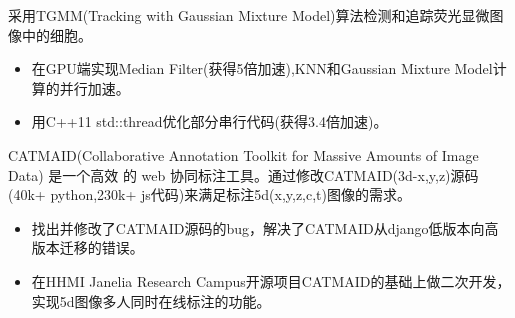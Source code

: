 \documentclass{resume}
\begin{document}
\begin{onehalfspacing}
   采用TGMM(Tracking with Gaussian Mixture Model)算法检测和追踪荧光显微图像中的细胞。
\begin{itemize}
    \item 在GPU端实现Median Filter(获得5倍加速),KNN和Gaussian Mixture Model计算的并行加速。
\vspace{0.5ex}
  \item 用C++11 std::thread优化部分串行代码(获得3.4倍加速)。
\end{itemize}
\end{onehalfspacing}


\begin{onehalfspacing}
CATMAID(Collaborative Annotation Toolkit for Massive Amounts of Image Data) 是一个高效
的 web 协同标注工具。通过修改CATMAID(3d-x,y,z)源码(40k+ python,230k+ js代码)来满足标注5d(x,y,z,c,t)图像的需求。
\begin{itemize}
  \item 找出并修改了CATMAID源码的bug，解决了CATMAID从django低版本向高版本迁移的错误。
\vspace{0.5ex}
  \item 在HHMI Janelia Research Campus开源项目CATMAID的基础上做二次开发，实现5d图像多人同时在线标注的功能。
\end{itemize}
\end{onehalfspacing}


\end{document}
